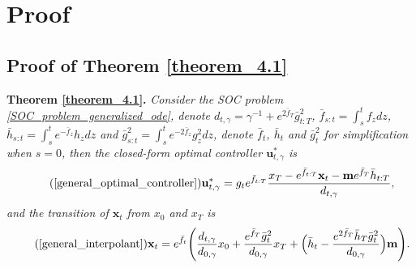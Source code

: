 \section{Proof}\label{append_proof}
\subsection{Proof of Theorem \ref{theorem_4.1}} \label{proof_theorem_4.1}
\noindent \textbf{Theorem \ref{theorem_4.1}.} 
\textit{Consider the SOC problem \eqref{SOC_problem_generalized_ode}, denote $d_{t, \gamma} = \gamma^{-1} + e^{2\bar{f}_{T}} \bar{g}^2_{t:T}$, $\bar{f}_{s:t} = \int_{s}^{t} f_z dz$, $\bar{h}_{s:t} = \int_{s}^{t} e^{-\bar{f}_{z}} h_z dz$ and $\bar{g}^2_{s:t} = \int_{s}^{t} e^{-2\bar{f}_{z}}g^2_z dz$, denote $\bar{f}_{t}$, $\bar{h}_{t}$ and $\bar{g}^2_{t}$ for simplification when $s=0$, then the closed-form optimal controller $\mathbf{u}_{t,\gamma}^{*}$ is} 
\begin{equation}\tag{\ref{general_optimal_controller}}
\mathbf{u}_{t, \gamma}^{*} = g_t e^{\bar{f}_{t:T}} \frac{x_{T} - e^{\bar{f}_{t:T}} \mathbf{x}_t - \mathbf{m} e^{\bar{f}_{T}} \bar{h}_{t:T}}{d_{t, \gamma}},
\end{equation}
\textit{and the transition of $\mathbf{x}_t$ from $x_0$ and $x_T$ is}
\begin{equation}\tag{\ref{general_interpolant}}
\mathbf{x}_t = e^{\bar{f}_{t}} \Bigg(\frac{d_{t, \gamma}}{d_{0, \gamma}} x_0 + \frac{e^{\bar{f}_{T}} \bar{g}^2_{t}}{d_{0, \gamma}} x_T + \Big(\bar{h}_{t} - \frac{e^{2\bar{f}_{T}} \bar{h}_{T} \bar{g}^2_{t}}{d_{0, \gamma}}\Big) \mathbf{m}\Bigg). 
\end{equation}

